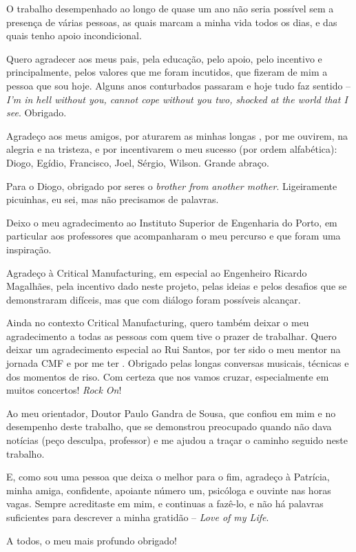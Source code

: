 \begin{acknowledgements}

O trabalho desempenhado ao longo de quase um ano não seria possível sem a presença de várias pessoas, as quais marcam a minha vida todos os dias, e das quais tenho apoio incondicional.

Quero agradecer aos meus pais, pela educação, pelo apoio, pelo incentivo e principalmente, pelos valores que me foram incutidos, que fizeram de mim a pessoa que sou hoje. Alguns anos conturbados passaram e hoje tudo faz sentido -- \textit{I'm in hell without you, cannot cope without you two, shocked at the world that I see}. Obrigado.

Agradeço aos meus amigos, por aturarem as minhas longas , por me ouvirem, na alegria e na tristeza, e por incentivarem o meu sucesso (por ordem alfabética): Diogo, Egídio, Francisco, Joel, Sérgio, Wilson. Grande abraço.

Para o Diogo, obrigado por seres o \textit{brother from another mother}. Ligeiramente picuinhas, eu sei, mas não precisamos de palavras.

Deixo o meu agradecimento ao Instituto Superior de Engenharia do Porto, em particular aos professores que acompanharam o meu percurso e que foram uma inspiração. 

Agradeço à Critical Manufacturing, em especial ao Engenheiro Ricardo Magalhães, pela incentivo dado neste projeto, pelas ideias e pelos desafios que se demonstraram difíceis, mas que com diálogo foram possíveis alcançar. 

Ainda no contexto Critical Manufacturing, quero também deixar o meu agradecimento a todas as pessoas com quem tive o prazer de trabalhar. Quero deixar um agradecimento especial ao Rui Santos, por ter sido o meu mentor na jornada CMF e por me ter . Obrigado pelas longas conversas musicais, técnicas e dos momentos de riso. Com certeza que nos vamos cruzar, especialmente em muitos concertos! \textit{Rock On}!

Ao meu orientador, Doutor Paulo Gandra de Sousa, que confiou em mim e no desempenho deste trabalho, que se demonstrou preocupado quando não dava notícias (peço desculpa, professor) e me ajudou a traçar o caminho seguido neste trabalho.

E, como sou uma pessoa que deixa o melhor para o fim, agradeço à Patrícia, minha amiga, confidente, apoiante número um, psicóloga e ouvinte nas horas vagas. Sempre acreditaste em mim, e continuas a fazê-lo, e não há palavras suficientes para descrever a minha gratidão -- \textit{Love of my Life}.

A todos, o meu mais profundo obrigado!
\end{acknowledgements}